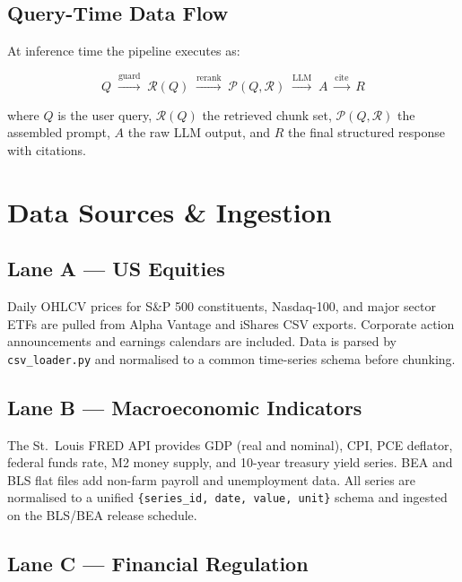 \documentclass[10pt,a4paper,twocolumn]{article}
\begin{document}
\subsection{Query-Time Data Flow}

At inference time the pipeline executes as:

\[
Q \;\xrightarrow{\text{guard}}\; \mathcal{R}(Q) \;\xrightarrow{\text{rerank}}\;
\mathcal{P}(Q,\mathcal{R}) \;\xrightarrow{\text{LLM}}\; A \;\xrightarrow{\text{cite}}\; R
\]

where $Q$ is the user query, $\mathcal{R}(Q)$ the retrieved chunk set,
$\mathcal{P}(Q,\mathcal{R})$ the assembled prompt, $A$ the raw LLM output,
and $R$ the final structured response with citations.

\section{Data Sources \& Ingestion}

\subsection{Lane A --- US Equities}

Daily OHLCV prices for S\&P 500 constituents, Nasdaq-100, and major sector ETFs are pulled
from Alpha Vantage and iShares CSV exports. Corporate action announcements and earnings
calendars are included. Data is parsed by \texttt{csv\_loader.py} and normalised to a
common time-series schema before chunking.

\subsection{Lane B --- Macroeconomic Indicators}

The St.\ Louis FRED API provides GDP (real and nominal), CPI, PCE deflator, federal funds
rate, M2 money supply, and 10-year treasury yield series. BEA and BLS flat files add
non-farm payroll and unemployment data. All series are normalised to a unified
\texttt{\{series\_id, date, value, unit\}} schema and ingested on the BLS/BEA release schedule.

\subsection{Lane C --- Financial Regulation}
\end{document}
